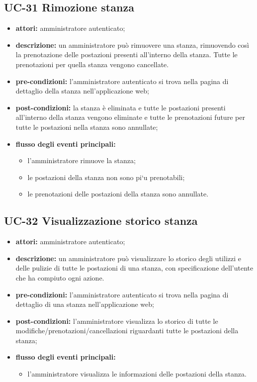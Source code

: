 \subsection{UC-31 Rimozione stanza}
\begin{itemize}
    \item \textbf{attori:} amministratore autenticato;
    \item \textbf{descrizione:} un amministratore pu\`{o} rimuovere una stanza, rimuovendo cos\`{i} la prenotazione delle postazioni presenti all'interno della stanza. Tutte le prenotazioni per quella stanza vengono cancellate.
    \item \textbf{pre-condizioni:} l'amministratore autenticato si trova nella pagina di dettaglio della stanza nell'applicazione web;
    \item \textbf{post-condizioni:} la stanza \`{e} eliminata e tutte le postazioni presenti all'interno della stanza vengono eliminate e tutte le prenotazioni future per tutte le postazioni nella stanza sono annullate;
    \item \textbf{flusso degli eventi principali:}
    \begin{itemize}
        \item l'amministratore rimuove la stanza;
        \item le postazioni della stanza non sono pi`{u} prenotabili;
        \item le prenotazioni delle postazioni della stanza sono annullate.
    \end{itemize}
\end{itemize}



\subsection{UC-32 Visualizzazione storico stanza}
\begin{itemize}
    \item \textbf{attori:} amministratore autenticato;
    \item \textbf{descrizione:} un amministratore pu\`{o} visualizzare lo storico degli utilizzi e delle pulizie di tutte le postazioni di una stanza, con specificazione dell'utente che ha compiuto ogni azione.
    \item \textbf{pre-condizioni:} l'amministratore autenticato si trova nella pagina di dettaglio di una stanza nell'applicazione web;
    \item \textbf{post-condizioni:} l'amministratore visualizza lo storico di tutte le modifiche/prenotazioni/cancellazioni riguardanti tutte le postazioni della stanza;
    \item \textbf{flusso degli eventi principali:}
    \begin{itemize}
        \item l'amministratore visualizza le informazioni delle postazioni della stanza.
    \end{itemize}
\end{itemize}



